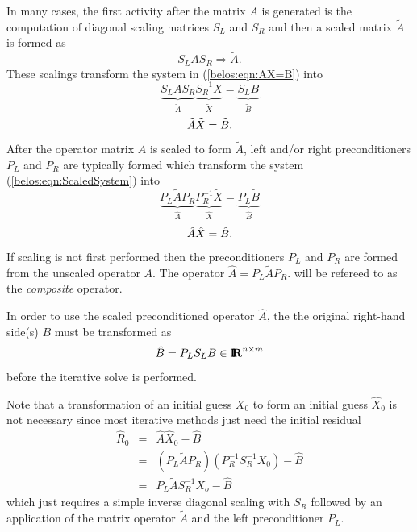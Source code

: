 \documentclass[pdf,ps2pdf,11pt]{SANDreport}
\begin{document}
In many cases, the first activity after the matrix $A$ is generated is
the computation of diagonal scaling matrices $S_L$ and $S_R$ and then
a scaled matrix $\tilde{A}$ is formed as
%
\begin{equation}
S_L A S_R \Rightarrow \tilde{A}.
\label{belos:eqn:A_tilde}
\end{equation}
%
These scalings transform the system in ({}\ref{belos:eqn:AX=B}) into
%
\[
\underbrace{S_L A S_R}_{\displaystyle{\tilde{A}}}
\underbrace{S_R^{-1} X}_{\displaystyle{\tilde{X}}}
=
\underbrace{S_L B}_{\displaystyle{\tilde{B}}}
\]
%
\begin{equation}
\nonumber \\
\tilde{A} \tilde{X}  = \tilde{B}.
\label{belos:eqn:ScaledSystem}
\end{equation}
%
After the operator matrix $A$ is scaled to form $\tilde{A}$, left
and/or right preconditioners $P_L$ and $P_R$ are typically formed
which transform the system ({}\ref{belos:eqn:ScaledSystem}) into
%
\[
\underbrace{P_L \tilde{A} P_R}_{\displaystyle{\hat{A}}}
\underbrace{P_R^{-1} \tilde{X}}_{\displaystyle{\hat{X}}}
=
\underbrace{P_L \tilde{B}}_{\displaystyle{\hat{B}}}
\]
%
\begin{equation}
\nonumber \\
\hat{A} \hat{X}  = \hat{B}.
\label{belos:eqn:PreconditionedSystem}
\end{equation}
%
If scaling is not first performed then the preconditioners $P_L$ and
$P_R$ are formed from the unscaled operator $A$.  The operator
$\hat{A} = P_L \tilde{A} P_R$.  will be refereed to as the
{}\textit{composite} operator.

In order to use the scaled preconditioned operator $\hat{A}$, the the
original right-hand side(s) $B$ must be transformed as
%
\begin{equation}
\hat{B} = P_L S_L B \in \mbox{\textbf{I}}\hspace{-0.6ex}\mbox{\textbf{R}}^{n \times m}
\label{B-preprocess}
\end{equation}
%
{}\noindent{}before the iterative solve is performed.

Note that a transformation of an initial guess $X_0$ to form an
initial guess $\hat{X}_0$ is not necessary since most iterative
methods just need the initial residual
%
\begin{eqnarray}
\hat{R}_0
& = & \hat{A} \hat{X}_0 - \hat{B}
\nonumber \\
& = & \left( P_L \tilde{A} P_R \right) \left( P_R^{-1} S_R^{-1} X_0 \right) - \hat{B}
\nonumber \\
& = & P_L \tilde{A} S_R^{-1} X_o - \hat{B}
\label{belos:eqn:R_hat_0}
\end{eqnarray}
%
{}\noindent{}which just requires a simple inverse diagonal scaling
with $S_R$ followed by an application of the matrix operator
$\tilde{A}$ and the left preconditioner $P_L$.
\end{document}

